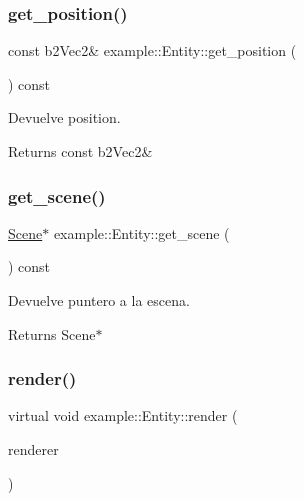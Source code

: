 \subsubsection{\texorpdfstring{get\_position()}{get\_position()}}
{\footnotesize\ttfamily const b2\+Vec2\& example\+::\+Entity\+::get\+\_\+position (\begin{DoxyParamCaption}{ }\end{DoxyParamCaption}) const\hspace{0.3cm}{\ttfamily [inline]}}



Devuelve position. 

\begin{DoxyReturn}{Returns}
const b2\+Vec2\& 
\end{DoxyReturn}
\mbox{\label{classexample_1_1_entity_a6d32a518949bb42bed3d13377c2ab7ad}} 
\subsubsection{\texorpdfstring{get\_scene()}{get\_scene()}}
{\footnotesize\ttfamily \mbox{\hyperlink{classexample_1_1_scene}{Scene}}$\ast$ example\+::\+Entity\+::get\+\_\+scene (\begin{DoxyParamCaption}{ }\end{DoxyParamCaption}) const\hspace{0.3cm}{\ttfamily [inline]}}



Devuelve puntero a la escena. 

\begin{DoxyReturn}{Returns}
Scene$\ast$ 
\end{DoxyReturn}
\mbox{\label{classexample_1_1_entity_a44477ee1f9ac52e9073ae0f78ba735d5}} 
\subsubsection{\texorpdfstring{render()}{render()}}
{\footnotesize\ttfamily virtual void example\+::\+Entity\+::render (\begin{DoxyParamCaption}\item[{sf\+::\+Render\+Window \&}]{renderer }\end{DoxyParamCaption})\hspace{0.3cm}{\ttfamily [virtual]}}




